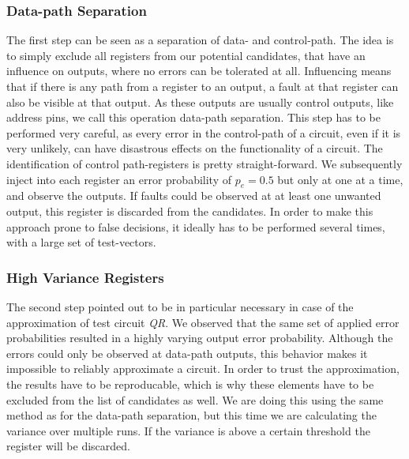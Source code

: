 \documentclass[conference]{IEEEtran}
\begin{document}
\subsubsection{Data-path Separation}
The first step can be seen as a separation of data- and control-path. The idea is to simply exclude all registers from our potential candidates, that have an influence on outputs, where no errors can be tolerated at all. Influencing means that if there is any path from a register to an output, a fault at that register can also be visible at that output. As these outputs are usually control outputs, like address pins, we call this operation data-path separation. This step has to be performed very careful, as every error in the control-path of a circuit, even if it is very unlikely, can have disastrous effects on the functionality of a circuit. The identification of control path-registers is pretty straight-forward. We subsequently inject into each register an error probability of $p_e=0.5$ but only at one at a time, and observe the outputs. If faults could be observed at at least one unwanted output, this register is discarded from the candidates. In order to make this approach prone to false decisions, it ideally has to be performed several times, with a large set of test-vectors.
\subsubsection{High Variance Registers}
\label{subsubsec:high_v}
The second step pointed out to be in particular necessary in case of the approximation of test circuit \emph{QR}. We observed that the same set of applied error probabilities resulted in a highly varying output error probability. Although the errors could only be observed at data-path outputs, this behavior makes it impossible to reliably approximate a circuit. In order to trust the approximation, the results have to be reproducable, which is why these elements have to be excluded from the list of candidates as well. We are doing this using the same method as for the data-path separation, but this time we are calculating the variance over multiple runs. If the variance is above a certain threshold the register will be discarded.
\end{document}
